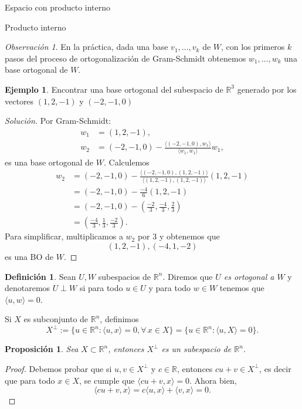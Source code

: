 \documentclass[a4paper,12pt,twoside,spanish]{amsbook}
\newtheorem{proposicion}[teorema]{Proposici\'on}
\theoremstyle{definition}
\newtheorem{definicion}{Definici\'on}[section]
\newtheorem{ejemplo}{Ejemplo}[section]
\theoremstyle{remark}
\newtheorem{obs}{Observaci\'on}[section]
\newcommand{\la}{\langle}
\newcommand{\ra}{\rangle}
\newcommand{\R}{\mathbb R}
\begin{document}
\begin{chapter}{Espacio con producto interno}
\begin{section}{Producto interno}
\begin{obs}
		En la práctica, dada una base $v_1,\ldots,v_k$ de $W$,  con los primeros $k$ pasos del proceso de ortogonalización de Gram-Schmidt obtenemos $ w_{1},\ldots,w_k $ una base ortogonal de $W$.
		\end{obs}
		
		\begin{ejemplo}
			Encontrar una base ortogonal del subespacio de $\R^3$ generado por los vectores $(1,2,-1)$ y $(-2,-1,0)$
			\begin{proof}[Solución] Por Gram-Schmidt:
				\begin{align*}
				w_1 &= (1,2,-1),  \\
				w_2 &= (-2,-1,0) - \frac{\la (-2,-1,0),w_1\ra}{\la w_1,w_1\ra}w_1,
				\end{align*}
				es una base ortogonal de $W$. Calculemos 
				\begin{align*}
					w_2  &= (-2,-1,0) - \frac{\la (-2,-1,0),(1,2,-1)\ra}{\la(1,2,-1),(1,2,-1)\ra}(1,2,-1)\\
					&= (-2,-1,0) - \frac{-4}{6}(1,2,-1) \\
					&= (-2,-1,0) - (\frac{-2}{3},\frac{-4}{3},\frac{2}{3}) \\
					&= (\frac{-4}{3},\frac{1}{3},\frac{-2}{3}).
				\end{align*}
				Para simplificar, multiplicamos a $w_2$ por $3$ y obtenemos que
				\begin{equation*}
					(1,2,-1), (-4,1,-2)
				\end{equation*} 
				es una BO de $W$. 
				
			\end{proof}  
		\end{ejemplo}
		
		\medskip
		
		\begin{definicion}  Sean $U, W$ subespacios de $\R^n$. Diremos que \textit{$U$ es ortogonal a $W$} y denotaremos $U \perp W$ si  para todo $u \in U$ y para todo $w \in W$ tenemos que $ \la u,w\ra =0$. 
			
			Si $X$ es subconjunto de $\R^n$,  definimos 
			$$
			X^\perp := \{u \in \R^n: \la u,x\ra = 0, \forall\, x \in X\} = \{u \in \R^n: \la u,X\ra = 0\}.
			$$ 
		\end{definicion}
		
		\begin{proposicion}
			Sea  $X \subset \R^n$, entonces $X^\perp$  es un subespacio de $\R^n$.
		\end{proposicion}
		\begin{proof}
			Debemos probar que si $u,v \in X^\perp$ y $c \in \R$,  entonces $cu+v \in X^\perp$,  es decir que para todo $x \in X$,  se cumple que  $\la cu+v,x\ra=0$. Ahora bien,
			$$
			\la cu+v,x\ra= c\la u,x\ra +\la v,x\ra= 0.
			$$
		\end{proof}
		

\end{section}
\end{chapter}
\end{document}
